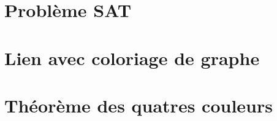 \documentclass{tipe}
\begin{document}

\clearpage

\part{Problème SAT}


\part{Lien avec coloriage de graphe}


\part{Théorème des quatres couleurs}




\end{document}
